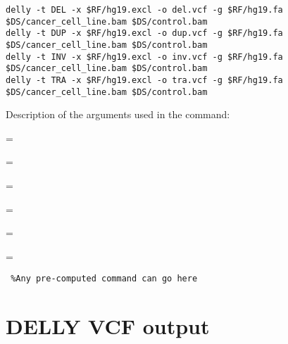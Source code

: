 \begin{lstlisting}
delly -t DEL -x $RF/hg19.excl -o del.vcf -g $RF/hg19.fa $DS/cancer_cell_line.bam $DS/control.bam
delly -t DUP -x $RF/hg19.excl -o dup.vcf -g $RF/hg19.fa $DS/cancer_cell_line.bam $DS/control.bam
delly -t INV -x $RF/hg19.excl -o inv.vcf -g $RF/hg19.fa $DS/cancer_cell_line.bam $DS/control.bam
delly -t TRA -x $RF/hg19.excl -o tra.vcf -g $RF/hg19.fa $DS/cancer_cell_line.bam $DS/control.bam

\end{lstlisting}

Description of the arguments used in the command: 
\begin{description}[style=multiline,labelindent=0cm,align=right,leftmargin=\descriptionlabelspace,rightmargin=1.5cm,font=\ttfamily]
  \item[DEL] = 
  \item[DUP] = 
  \item[INV] = 
  \item[TRA] = 
  \item[-o] = 
  \item[-g] = 
\end{description}

\begin{warning}
  \begin{lstlisting}
 %Any pre-computed command can go here
  \end{lstlisting}
\end{warning}

\section{DELLY VCF output}


